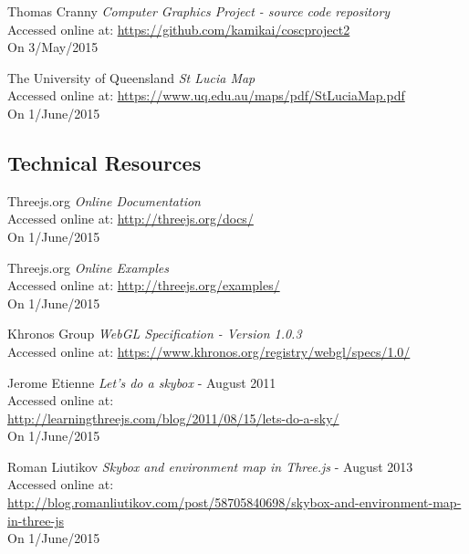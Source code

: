 \begin{thebibliography}{99}

    Thomas Cranny
    \textit{Computer Graphics Project - source code repository}\\
    Accessed online at:
    \href{https://github.com/kamikai/cosc_project2}{https://github.com/kamikai/cosc{\textunderscore}project2}\\
    On 3/May/2015

    The University of Queensland
    \textit{St Lucia Map}\\
    Accessed online at:
    \href{https://www.uq.edu.au/maps/pdf/StLuciaMap.pdf}{https://www.uq.edu.au/maps/pdf/StLuciaMap.pdf}\\
    On 1/June/2015

\subsection{Technical Resources}
\label{ref:technical_resources}

        Threejs.org
        \textit{Online Documentation}\\
        Accessed online at:
        \href{http://threejs.org/docs/}{http://threejs.org/docs/}\\
        On 1/June/2015

        Threejs.org
        \textit{Online Examples}\\
        Accessed online at:
        \href{http://threejs.org/examples/}{http://threejs.org/examples/}\\
        On 1/June/2015

        Khronos Group
        \textit{WebGL Specification - Version 1.0.3}\\
        Accessed online at:
        \href{https://www.khronos.org/registry/webgl/specs/1.0/}{https://www.khronos.org/registry/webgl/specs/1.0/}

        Jerome Etienne
        \textit{Let's do a skybox} - August 2011 \\
        Accessed online at: \\
        \href{http://learningthreejs.com/blog/2011/08/15/lets-do-a-sky/}{http://learningthreejs.com/blog/2011/08/15/lets-do-a-sky/}\\
        On 1/June/2015

        Roman Liutikov
        \textit{Skybox and environment map in Three.js} - August 2013 \\
        Accessed online at: \\
        \href{http://blog.romanliutikov.com/post/58705840698/skybox-and-environment-map-in-three-js}{http://blog.romanliutikov.com/post/58705840698/skybox-and-environment-map-in-three-js}\\
        On 1/June/2015


\end{thebibliography}
